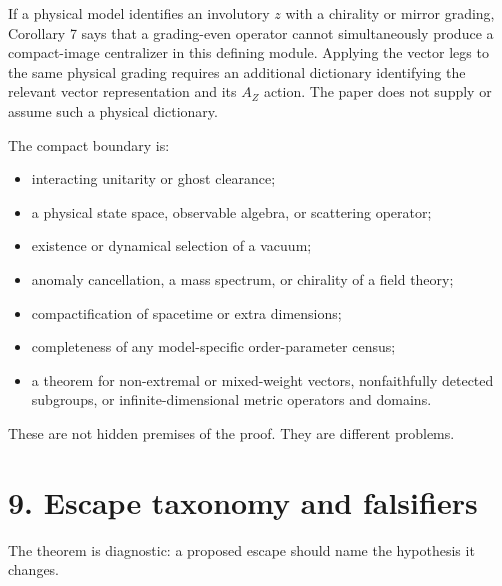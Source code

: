\documentclass[
  10pt,
  letterpaper,
  oneside]{scrartcl}
\providecommand{\tightlist}{%
  \setlength{\itemsep}{0pt}\setlength{\parskip}{0pt}}
\begin{document}
If a physical model identifies an involutory \(z\) with a chirality or
mirror grading, Corollary 7 says that a grading-even operator cannot
simultaneously produce a compact-image centralizer in this defining
module. Applying the vector legs to the same physical grading requires
an additional dictionary identifying the relevant vector representation
and its \(A_Z\) action. The paper does not supply or assume such a
physical dictionary.

The compact boundary is:

\begin{itemize}
\tightlist
\item
  interacting unitarity or ghost clearance;
\item
  a physical state space, observable algebra, or scattering operator;
\item
  existence or dynamical selection of a vacuum;
\item
  anomaly cancellation, a mass spectrum, or chirality of a field theory;
\item
  compactification of spacetime or extra dimensions;
\item
  completeness of any model-specific order-parameter census;
\item
  a theorem for non-extremal or mixed-weight vectors, nonfaithfully
  detected subgroups, or infinite-dimensional metric operators and
  domains.
\end{itemize}

These are not hidden premises of the proof. They are different problems.

\section{9. Escape taxonomy and
falsifiers}\label{escape-taxonomy-and-falsifiers}

The theorem is diagnostic: a proposed escape should name the hypothesis
it changes.
\end{document}
